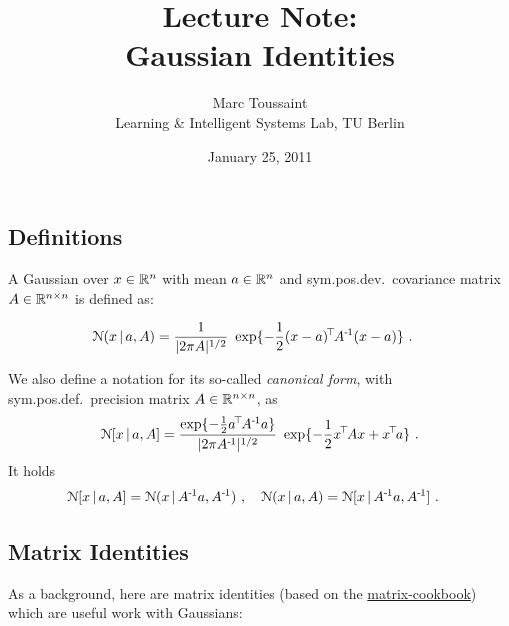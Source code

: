 
\note[9pt]

\title{Lecture Note:\\ Gaussian Identities}
\author{Marc Toussaint\\\small Learning \& Intelligent Systems Lab, TU Berlin}
\date{January 25, 2011}

\makeatletter
\renewcommand{\@seccntformat}[1]{}
\makeatother

\renewcommand{\mT}{{\text{-}\!\top}}
\renewcommand{\-}{\!-\!}
\newcommand{\+}{\!+\!}

\notetitle


\subsection{Definitions}

A Gaussian over $x\in{\mathbb{R}}^n$ with mean $a\in{\mathbb{R}}^n$
and sym.pos.dev.\ covariance matrix $A\in{\mathbb{R}}^{n\times n}$ is defined as:

\begin{align}
{\cal N}(x \,|\, a,A) &= \frac{1}{|2\pi A|^{1/2}}~ \exp\{-\frac{1}{2} (x-a)^{\!\top\!}
A^{{\hspace*{-.0pt}\text{\rm -}\hspace*{-.5pt}}1} (x-a)\} ~.
\end{align}

We also define a notation for its so-called \emph{canonical form},
with sym.pos.def.\ precision matrix $A\in{\mathbb{R}}^{n\times n}$, as
\begin{align}
{\cal N}[x \,|\, a,A]
 = \frac{\exp\{-\frac{1}{2} a^{\!\top\!} A^{{\hspace*{-.0pt}\text{\rm -}\hspace*{-.5pt}}1}a\}}{|2\pi A^{{\hspace*{-.0pt}\text{\rm -}\hspace*{-.5pt}}1}|^{1/2}}~
   \exp\{-\frac{1}{2} x^{\!\top\!} A x + x^{\!\top\!} a\} ~.
\end{align}
It holds
\begin{align}
& {\cal N}[x \,|\, a,A] = {\cal N}(x \,|\, A^{{\hspace*{-.0pt}\text{\rm -}\hspace*{-.5pt}}1} a, A^{{\hspace*{-.0pt}\text{\rm -}\hspace*{-.5pt}}1}) ~,\quad
 {\cal N}(x \,|\, a,A) = {\cal N}[x \,|\, A^{{\hspace*{-.0pt}\text{\rm -}\hspace*{-.5pt}}1} a, A^{{\hspace*{-.0pt}\text{\rm -}\hspace*{-.5pt}}1}] ~.
\end{align}



\subsection{Matrix Identities}

As a background, here are matrix identities (based on
the \href{https://www.math.uwaterloo.ca/~hwolkowi/matrixcookbook.pdf}{matrix-cookbook})
which are useful work with Gaussians:

